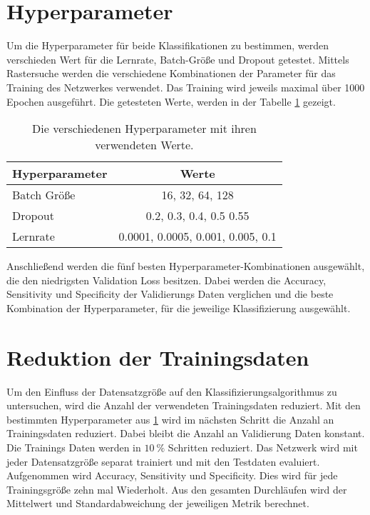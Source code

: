 \section{Hyperparameter}\label{sec:Hyperparameter}

Um die Hyperparameter für beide Klassifikationen zu bestimmen, werden verschieden Wert für die
Lernrate, Batch-Größe und Dropout getestet.
Mittels Rastersuche werden die verschiedene Kombinationen der Parameter für das Training des Netzwerkes verwendet. 
Das Training wird jeweils maximal über 1000 Epochen ausgeführt.
Die getesteten Werte, werden in der Tabelle \ref{tab:Hypp} gezeigt.

\begin{table}[htbp]
    \centering
    \begin{tabular}{l c }
        \hline
        Hyperparameter     & Werte \\
        \hline
        Batch Größe    & 16, 32, 64, 128   \\
        Dropout        & 0.2, 0.3, 0.4, 0.5 0.55   \\
        Lernrate       & 0.0001, 0.0005, 0.001, 0.005, 0.1   \\
        \hline
  \end{tabular}
  \caption{Die verschiedenen Hyperparameter mit ihren verwendeten Werte.}
  \label{tab:Hypp}
\end{table}


Anschließend werden die fünf besten Hyperparameter-Kombinationen ausgewählt, die den niedrigsten Validation Loss besitzen.
Dabei werden die Accuracy, Sensitivity und Specificity der Validierungs Daten verglichen und die beste Kombination der Hyperparameter, 
für die jeweilige Klassifizierung ausgewählt.  

\section{Reduktion der Trainingsdaten}\label{sec:Red1}
Um den Einfluss der Datensatzgröße auf den Klassifizierungsalgorithmus zu untersuchen, wird die Anzahl der verwendeten Trainingsdaten reduziert.
Mit den bestimmten Hyperparameter aus \ref{sec:Hyperparameter} wird im nächsten Schritt die Anzahl an Trainingsdaten reduziert.
Dabei bleibt die Anzahl an Validierung Daten konstant.
Die Trainings Daten werden in $\qty{10}{\%}$ Schritten reduziert. 
Das Netzwerk wird mit jeder Datensatzgröße separat trainiert und mit den Testdaten evaluiert. 
Aufgenommen wird Accuracy, Sensitivity und Specificity.
Dies wird für jede Trainingsgröße zehn mal Wiederholt.
Aus den gesamten Durchläufen wird der Mittelwert und Standardabweichung der jeweiligen Metrik berechnet.

